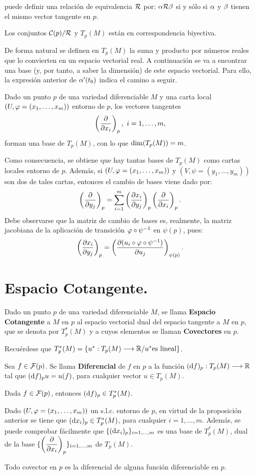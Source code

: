 \documentclass[cursovd_portada.tex]{subfiles}
\begin{document}
puede definir una relación de equivalencia ${\cal R}$ por: $\alpha{\cal R}\beta$ si y sólo si $\alpha$ y $\beta$ tienen el mismo
vector tangente en $p$.
\begin{prop}
Los conjuntos ${\cal C}(p)/{\cal R}$ y $T_p(M)$ están en correspondencia biyectiva.
\end{prop}
De forma natural se definen en $T_p(M)$ la suma y producto por
números reales que lo convierten en un espacio vectorial real.
A continuación se va a encontrar una base (y, por tanto, a
saber la dimensión) de este espacio vectorial. Para ello, la
expresión anterior de $\alpha'(t_0)$ indica el camino a seguir.
\begin{teorema}
Dado un punto $p$ de una variedad diferenciable $M$ y una carta local $(U,\varphi=(x_1,\dots ,x_m))$ entorno de $p$,
los vectores tangentes
$$\left(\displaystyle{\frac{\partial}{\partial x_i}}\right)_p,\mbox{ }i=1,\dots ,m,$$
forman una base de $T_p(M)$, con lo que ${\rm dim}(T_p(M))=m$.
\end{teorema}
Como consecuencia, se obtiene que hay tantas bases de $T_p(M)$ como cartas locales entorno de $p$. Además, si
$(U,\varphi=(x_1,\dots ,x_m))$ y $(V,\psi=(y_1,\dots ,y_m))$ son dos de tales cartas, entonces el cambio de bases
viene dado por:
$$\left( \displaystyle{\frac{\partial}{\partial y_j}}\right)_p=\sum_{i=1}^m\left(\displaystyle{\frac{\partial x_i}{\partial y_j}}\right)_p\left( \displaystyle{\frac{\partial}{\partial x_i}}\right)_p.$$
\hs Debe observarse que la matriz de cambio de bases es, realmente, la matriz jacobiana de la aplicación de
transición $\varphi\circ\psi^{-1}$ en $\psi(p)$, pues:
$$\left(\displaystyle{\frac{\partial x_i}{\partial y_j}}\right)_p=\left(\displaystyle{\frac{\partial (u_i\circ\varphi\circ\psi^{-1})}{\partial u_j}}\right)_{\psi(p)}.$$
\section{Espacio Cotangente.}
\begin{defi}
Dado un punto $p$ de una variedad diferenciable $M$, se llama {\bf Espacio Cotangente} a $M$ en $p$ al espacio
vectorial dual del espacio tangente a $M$ en $p$, que se denota por $T_p^*(M)$ y a cuyos elementos se llaman {\bf
Covectores} en $p$.
\end{defi}
Recuérdese que $T_p^*(M)=\{u^*:T_p(M)\longrightarrow\mathbb{R} /u^* {\rm es}\mbox{ }{\rm lineal}\}$.
\begin{defi}
Sea $f\in{\cal F}(p)$. Se llama {\bf Diferencial} de $f$ en $p$ a la función $({\rm d} f)_p:T_p(M)\longrightarrow\mathbb{R}$ tal que
$({\rm d} f)_pu=u(f)$, para cualquier vector $u\in T_p(M)$.
\end{defi}
\begin{prop}
Dada $f\in{\cal F}(p)$, entonces $({\rm d} f)_p\in T_p^*(M)$.
\end{prop}
Dado $(U,\varphi=(x_1,\dots ,x_m))$ un s.l.c. entorno de $p$, en virtud de la proposición anterior se tiene que
$({\rm d} x_i)_p\in T_p^*(M)$, para cualquier $i=1,\dots ,m$. Además, se puede comprobar fácilmente que
$\{({\rm d} x_i)_p\}_{i=1,\dots ,m}$ es una base de $T_p^*(M)$, dual de la base
$\{\left(\displaystyle{\frac{\partial}{\partial x_i}}\right)_p\}_{i=1,\dots ,m}$ de $T_p(M)$.
\begin{prop}
Todo covector en $p$ es la diferencial de alguna función diferenciable en $p$.
\end{prop}
\end{document}
